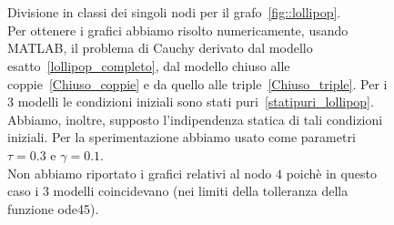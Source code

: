 \begin{figure}[!htb]
	\centering
{}
\\
 \\
\caption[Confronto tra il modello esatto, chiuso alle coppie e alle triple per il grafo~\ref{fig::lollipop}]
{Divisione in classi dei singoli nodi per il grafo~\ref{fig::lollipop}.\\
Per ottenere i grafici abbiamo risolto numericamente,  usando MATLAB, il problema di Cauchy derivato dal modello esatto~\eqref{lollipop_completo},  dal modello chiuso alle coppie~\eqref{Chiuso_coppie} e da quello alle triple~\eqref{Chiuso_triple}.
Per i $3$ modelli le condizioni iniziali sono stati puri~\eqref{statipuri_lollipop}. Abbiamo, inoltre,  supposto l'indipendenza statica di tali condizioni iniziali.
Per la sperimentazione abbiamo usato come parametri $\tau = 0.3$ e $\gamma = 0.1$.\\
Non abbiamo riportato i grafici relativi al nodo $4$ poich\`e in questo caso i 3 modelli coincidevano (nei limiti della tolleranza della funzione ode45).}
\label{fig::confronto_modelli}
\end{figure}

